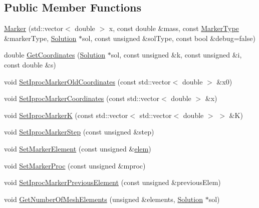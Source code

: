 \subsection*{Public Member Functions}
\begin{DoxyCompactItemize}
\item 
\mbox{\hyperlink{classfemus_1_1_marker_a103dd94b8a6b3f67c76c9b437f51af79}{Marker}} (std\+::vector$<$ double $>$ x, const double \&mass, const \mbox{\hyperlink{_marker_type_enum_8hpp_ade22213fff69cfb37d8238e8fd3073df}{Marker\+Type}} \&marker\+Type, \mbox{\hyperlink{classfemus_1_1_solution}{Solution}} $\ast$sol, const unsigned \&sol\+Type, const bool \&debug=false)
\item 
double \mbox{\hyperlink{classfemus_1_1_marker_a1070ae16bddb9848292c9f1bbb13fa07}{Get\+Coordinates}} (\mbox{\hyperlink{classfemus_1_1_solution}{Solution}} $\ast$sol, const unsigned \&k, const unsigned \&i, const double \&s)
\item 
void \mbox{\hyperlink{classfemus_1_1_marker_a1d02fb5c2c0fe7dbc343cfb6205beae9}{Set\+Iproc\+Marker\+Old\+Coordinates}} (const std\+::vector$<$ double $>$ \&x0)
\item 
void \mbox{\hyperlink{classfemus_1_1_marker_affbfba68fa9f8feecf59b48a0bcea8d7}{Set\+Iproc\+Marker\+Coordinates}} (const std\+::vector$<$ double $>$ \&x)
\item 
void \mbox{\hyperlink{classfemus_1_1_marker_ad09bfae9f0fa2299502e8959d8fe0fc3}{Set\+Iproc\+MarkerK}} (const std\+::vector$<$ std\+::vector$<$ double $>$ $>$ \&K)
\item 
void \mbox{\hyperlink{classfemus_1_1_marker_a76f9588d5ee4a8f1ec195f4bff072f33}{Set\+Iproc\+Marker\+Step}} (const unsigned \&step)
\item 
void \mbox{\hyperlink{classfemus_1_1_marker_ae8862ce87571f05abe2cc43f2dbf1b6a}{Set\+Marker\+Element}} (const unsigned \&\mbox{\hyperlink{classfemus_1_1elem}{elem}})
\item 
void \mbox{\hyperlink{classfemus_1_1_marker_ad429d69406b213669c37ae30312d2fd6}{Set\+Marker\+Proc}} (const unsigned \&mproc)
\item 
void \mbox{\hyperlink{classfemus_1_1_marker_afdd4fec140304e2c44dbad719a7ffd6e}{Set\+Iproc\+Marker\+Previous\+Element}} (const unsigned \&previous\+Elem)
\item 
void \mbox{\hyperlink{classfemus_1_1_marker_a56821a36723f7a61405c6ffaff3ddd9c}{Get\+Number\+Of\+Mesh\+Elements}} (unsigned \&elements, \mbox{\hyperlink{classfemus_1_1_solution}{Solution}} $\ast$sol)
\item 

\end{DoxyCompactItemize}
